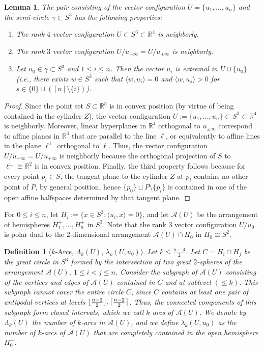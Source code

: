 \documentclass[11pt]{article}
\newtheorem{lemma}[theorem]{Lemma}
\newtheorem{definition}[theorem]{Definition}
\renewcommand{\leq}{\leqslant}
\newcommand{\R}{\mathbb{R}}
\DeclarePairedDelimiter\ceil{\lceil}{\rceil}
\DeclarePairedDelimiter\floor{\lfloor}{\rfloor}
\begin{document}
%
\begin{lemma} 
\label{lem:special}
The pair consisting of the vector configuration $U=\{u_1,\dots,u_n\}$ and the semi-circle $\gamma\subset S^3$ has the following properties:
\begin{enumerate}
\item The rank $4$ vector configuration $U \subset S^3 \subset \R^4$ is neighborly.
\item The rank $3$ vector configuration $U/u_{-\infty}=U/u_{+\infty}$ is neighborly.
\item Let $u_0 \in \gamma \subset S^3$ and $1\leq i \leq n$. Then the vector $u_i$ is extremal in $U \sqcup \{ u_0 \}$ (i.e., there exists $w\in S^3$ such that $\langle w,u_i\rangle =0$ and $\langle w,u_s\rangle > 0$ for $s\in \{0\}\sqcup ([n]\setminus \{i\})$). 
\end{enumerate}
\end{lemma}
\begin{proof} Since the point set $S\subset \R^3$ is in convex position (by virtue of being contained in the cylinder $Z$), the vector configuration $U:=\{u_1,\dots,u_n\} \subset S^3 \subset \R^4$ is neighborly. 
%
Moreover, linear hyperplanes in $\R^4$ orthogonal to $u_{\pm \infty}$ correspond to affine planes in $\R^3$ that are parallel to the line $\ell$, or equivalently to affine lines in the plane $\ell^\bot$ orthogonal to $\ell$. Thus, the vector configuration $U/u_{-\infty}=U/u_{+\infty}$ is neighborly because the orthogonal projection of $S$ to $\ell^\bot\cong \R^2$ is in convex position. 
%
Finally, the third property follows because for every point $p_i \in S$, the tangent plane to the cylinder $Z$ at $p_i$ contains no other point of $P$, by general position, hence $\{p_0\}\sqcup P\setminus\{p_i\}$ is contained in one of the open affine halfspaces determined by that tangent plane.
\end{proof}
For $0\leq i \leq n$, let $H_i:=\{x\in S^3\colon \langle u_i,x\rangle =0\}$, and let $\mathcal{A}(U)$ be the arrangement of hemispheres $H_1^+,\dots, H_n^+$ in $S^3$. Note that the rank $3$ vector configuration $U/u_0$ is polar dual to the $2$-dimensional arrangement $\mathcal{A}(U)\cap H_0$ in $H_0 \cong S^2$.
%
\begin{definition}[$k$-Arcs, $\Lambda_k(U)$, $\lambda_k(U,u_0)$] 
\label{def:k-arcs}
Let $k\leq \frac{n-4}{2}$. Let $C=H_i\cap H_j$ be the great circle in $S^3$ formed by the intersection of two great $2$-spheres of the arrangement $\mathcal{A}(U)$, $1\leq i<j\leq n$. Consider the subgraph of $\mathcal{A}(U)$ consisting of the vertices and edges of $\mathcal{A}(U)$ contained in $C$ and at sublevel $(\leq k)$. This subgraph cannot cover the entire circle $C$, since $C$ contains at least one pair of antipodal vertices at levels $\floor{\frac{n-2}{2}}, \ceil{\frac{n-2}{2}}$. Thus, the connected components of this subgraph form closed intervals, which we call \emph{$k$-arcs} of $\mathcal{A}(U)$. 
%
We denote by  $\Lambda_k(U)$ the number of $k$-arcs in $\mathcal{A}(U)$, and we define $\lambda_k(U,u_0)$ as the number of $k$-arcs of $\mathcal{A}(U)$ that are completely contained in the open hemisphere $H_0^-$.
\end{definition}
\end{document}

